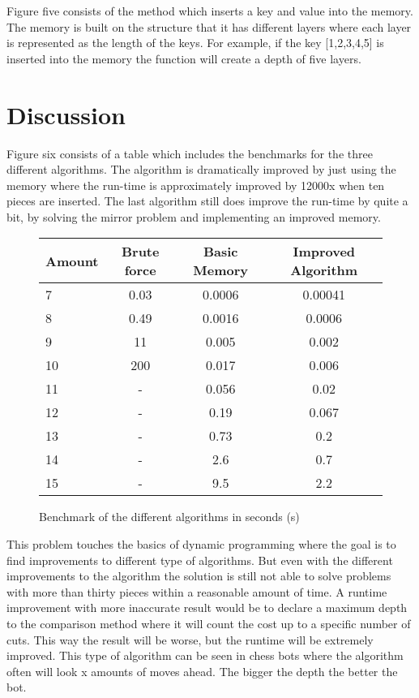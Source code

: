 \documentclass[a4paper,11pt]{article}
\begin{document}
Figure five consists of the method which inserts a key and value into the memory. The memory is built on the structure that it has different layers where each layer is represented as the length of the keys. For example, if the key [1,2,3,4,5] is inserted into the memory the function will create a depth of five layers.

\section*{Discussion}
Figure six consists of a table which includes the benchmarks for the three different algorithms. The algorithm is dramatically improved by just using the memory where the run-time is approximately improved by 12000x when ten pieces are inserted. The last algorithm still does improve the run-time by quite a bit, by solving the mirror problem and implementing an improved memory.

\begin{figure}[H]
\begin{center}
\begin{tabular}{l|c|c|c}
\textbf{Amount} & \textbf{Brute force} & \textbf{Basic Memory} & \textbf{Improved Algorithm}\\
\hline
  7 & 0.03 & 0.0006 & 0.00041\\
  8 & 0.49 & 0.0016 & 0.0006\\
  9 & 11 & 0.005 & 0.002\\
  10 & 200 & 0.017 & 0.006\\
  11 & - & 0.056 & 0.02\\
  12 & - & 0.19 & 0.067\\
  13 & - & 0.73 & 0.2\\
  14 & - & 2.6 & 0.7\\
  15 & - & 9.5 & 2.2\\
\end{tabular}
\caption{Benchmark of the different algorithms in seconds (s)}
\label{Figure:6}
\end{center}
\end{figure}

This problem touches the basics of dynamic programming where the goal is to find improvements to different type of algorithms. But even with the different improvements to the algorithm the solution is still not able to solve problems with more than thirty pieces within a reasonable amount of time. A runtime improvement with more inaccurate result would be to declare a maximum depth to the comparison method where it will count the cost up to a specific number of cuts. This way the result will be worse, but the runtime will be extremely improved. This type of algorithm can be seen in chess bots where the algorithm often will look x amounts of moves ahead. The bigger the depth the better the bot.
\end{document}
